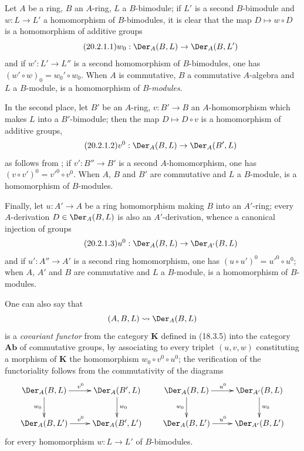 \begin{env}[20.2.1]
\label{0.20.2.1}
Let $A$ be a ring, $B$ an $A$-ring, $L$ a $B$-bimodule; if $L'$ is a second $B$-bimodule and $w:L\to L'$ a homomorphism of $B$-bimodules, it is clear that the map $D\mapsto w\circ D$ is a homomorphism of additive groups
\begin{equation}
\tag{20.2.1.1}
  \label{0.20.2.1.1}
  w_0:\Der_A(B,L)\to\Der_A(B,L')
\end{equation}
and if $w':L'\to L''$ is a second homomorphism of $B$-bimodules, one has $(w'\circ w)_0=w_0'\circ w_0$.
When $A$ is commutative, $B$ a commutative $A$-algebra and $L$ a $B$-module,  is a homomorphism of $B$-\emph{modules}.

In the second place, let $B'$ be an $A$-ring, $v:B'\to B$ an $A$-homomorphism which makes $L$ into a $B'$-bimodule; then the map $D\mapsto D\circ v$ is a homomorphism of additive groups,
\begin{equation}
\tag{20.2.1.2}
  \label{0.20.2.1.2}
  v^0:\Der_A(B,L)\to\Der_A(B',L)
\end{equation}
as follows from ; if $v':B''\to B'$ is a second $A$-homomorphism, one has $(v\circ v')^0=v'^0\circ v^0$.
When $A$, $B$ and $B'$ are commutative and $L$ a $B$-module,  is a homomorphism of $B$-modules.

Finally, let $u:A'\to A$ be a ring homomorphism making $B$ into an $A'$-ring; every $A$-derivation $D\in\Der_A(B,L)$ is also an $A'$-derivation, whence a canonical injection of groups
\begin{equation}
\tag{20.2.1.3}
  \label{0.20.2.1.3}
  u^0:\Der_A(B,L)\to\Der_{A'}(B,L)
\end{equation}
and if $u':A''\to A'$ is a second ring homomorphism, one has $(u\circ u')^0=u'^0\circ u^0$;
when $A$, $A'$ and $B$ are commutative and $L$ a $B$-module,  is a homomorphism of $B$-modules.

One can also say that
\[
  (A,B,L)\leadsto\Der_A(B,L)
\]
is a \emph{covariant functor} from the category $\boldsymbol{K}$ defined in (18.3.5) into the category $\boldsymbol{Ab}$ of commutative groups, by associating to every triplet $(u,v,w)$ constituting a morphism of $\boldsymbol{K}$ the homomorphism $w_0\circ v^0\circ u^0$; the verification of the functoriality follows from the commutativity of the diagrams
\[
\xymatrix{
  \Der_A(B,L) \ar[r]^{v^0} \ar[d]_{w_0} & \Der_A(B',L) \ar[d]^{w_0} \\
  \Der_A(B,L') \ar[r]^{v^0} & \Der_A(B',L')
}
\qquad
\xymatrix{
  \Der_A(B,L) \ar[r]^{u^0} \ar[d]_{w_0} & \Der_{A'}(B,L) \ar[d]^{w_0} \\
  \Der_A(B,L') \ar[r]^{u^0} & \Der_{A'}(B,L')
}
\]
for every homomorphism $w:L\to L'$ of $B$-bimodules.
\end{env}

